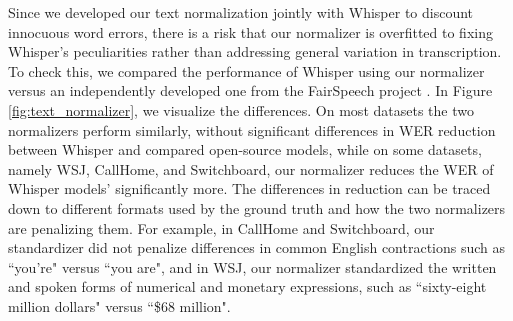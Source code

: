 Since we developed our text normalization jointly with Whisper to discount innocuous word errors, there is a risk that our normalizer is overfitted to fixing Whisper's peculiarities rather than addressing general variation in transcription. To check this, we compared the performance of Whisper using our normalizer versus an independently developed one from the FairSpeech project \cite{koenecke2020racial}. In Figure \ref{fig:text_normalizer}, we visualize the differences. On most datasets the two normalizers perform similarly, without significant differences in WER reduction between Whisper and compared open-source models, while on some datasets, namely WSJ, CallHome, and Switchboard, our normalizer reduces the WER of Whisper models' significantly more. The differences in reduction can be traced down to different formats used by the ground truth and how the two normalizers are penalizing them. For example, in CallHome and Switchboard, our standardizer did not penalize differences in common English contractions such as ``you're" versus ``you are", and in WSJ, our normalizer standardized the written and spoken forms of numerical and monetary expressions, such as ``sixty-eight million dollars" versus ``\$68 million".


